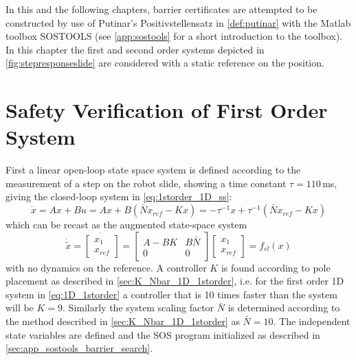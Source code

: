 In this and the following chapters, barrier certificates are attempted to be constructed by use of Putinar's Positivstellensatz in \autoref{def:putinar} with the Matlab toolbox SOSTOOLS (see \autoref{app:sostools} for a short introduction to the toolbox). In this chapter the first and second order systems depicted in \autoref{fig:stepresponseslide} are considered with a static reference on the position.




\section{Safety Verification of First Order System}
First a linear open-loop state space system is defined according to the measurement of a step on the robot slide, showing a time constant $\tau=110$\,ms, giving the closed-loop system in \autoref{eq:1storder_1D_ss}:
\begin{equation}
\dot{x} = Ax+Bu = Ax+B(\bar{N}x_{ref}-Kx) = %
-\tau^{-1}x+\tau^{-1}(\bar{N}x_{ref}-Kx)
\label{eq:1D_1storder}
\end{equation} 
which can be recast as the augmented state-space system
\begin{equation}
\dot{\tilde{x}}=
\dot{\begin{bmatrix}
	x_1\\x_{ref}
	\end{bmatrix}} =
\begin{bmatrix}
A-BK&B\bar{N}\\0&0
\end{bmatrix}
\begin{bmatrix}
x_1\\x_{ref}
\end{bmatrix}
= f_{cl}(x)
\label{eq:xtilde_1storder_1D}
\end{equation}
with no dynamics on the reference. A controller $K$ is found according to pole placement as described in \autoref{sec:K_Nbar_1D_1storder}, i.e. for the first order 1D system in \autoref{eq:1D_1storder} a controller that is 10 times faster than the system will be $K=9$. Similarly the system scaling factor $\bar{N}$ is determined according to the method described in \autoref{sec:K_Nbar_1D_1storder} as $\bar{N}=10$.
The independent state variables are defined and the SOS program initialized as described in \autoref{sec:app_sostools_barrier_search}.


